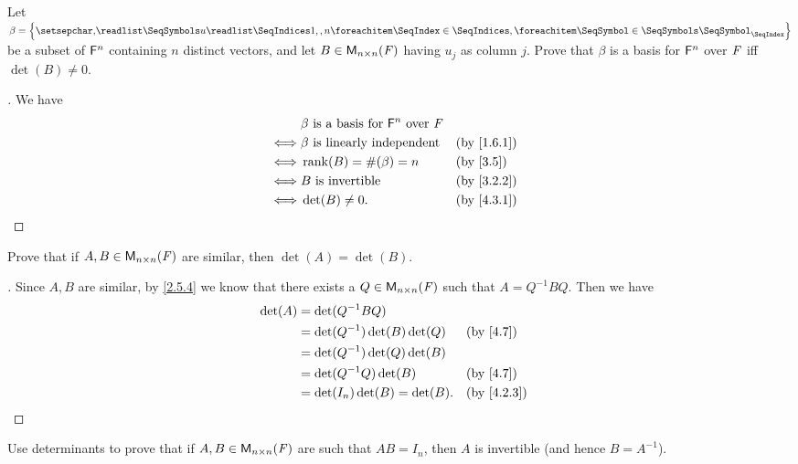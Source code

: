 \begin{ex}\label{ex:4.3.14}
	Let \(\beta = \set{\seq{u}{1,,n}}\) be a subset of \(\mathsf{F}^n\) containing \(n\) distinct vectors, and let \(B \in \mathsf{M}_{{n} \times n}({\mathit{F}})\) having \(u_j\) as column \(j\).
	Prove that \(\beta\) is a basis for \(\mathsf{F}^n\) over \(\mathit{F}\) iff \(\det(B) \neq 0\).
\end{ex}

\begin{proof}[]
	We have
	\begin{align*}
		     & \beta \text{ is a basis for } \vs{F}^n \text{ over } \F                 \\
		\iff & \beta \text{ is linearly independent}                   &  & \by{1.6.1} \\
		\iff & \rk{B} = \#(\beta) = n                                  &  & \by{3.5}   \\
		\iff & B \text{ is invertible}                                 &  & \by{3.2.2} \\
		\iff & \det(B) \neq 0.                                         &  & \by{4.3.1}
	\end{align*}
\end{proof}

\begin{ex}\label{ex:4.3.15}
	Prove that if \(A, B \in \mathsf{M}_{{n} \times n}({\mathit{F}})\) are similar, then \(\det(A) = \det(B)\).
\end{ex}

\begin{proof}[]
	Since \(A, B\) are similar, by \cref{2.5.4} we know that there exists a \(Q \in \mathsf{M}_{{n} \times n}({\mathit{F}})\) such that \(A = Q^{-1} B Q\).
	Then we have
	\begin{align*}
		\det(A) & = \det(Q^{-1} B Q)                             \\
		        & = \det(Q^{-1}) \det(B) \det(Q) &  & \by{4.7}   \\
		        & = \det(Q^{-1}) \det(Q) \det(B)                 \\
		        & = \det(Q^{-1} Q) \det(B)       &  & \by{4.7}   \\
		        & = \det(I_n) \det(B) = \det(B). &  & \by{4.2.3}
	\end{align*}
\end{proof}

\begin{ex}\label{ex:4.3.16}
	Use determinants to prove that if \(A, B \in \mathsf{M}_{{n} \times n}({\mathit{F}})\) are such that \(AB = I_n\), then \(A\) is invertible
	(and hence \(B = A^{-1}\)).
\end{ex}

